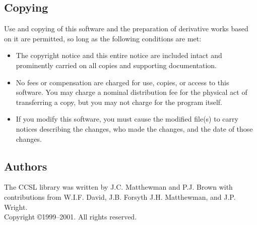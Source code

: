 \subsection{Copying}%
Use and copying of this software and the preparation of derivative
works based on it are permitted, so long as the following
conditions are met:
\begin{itemize}
\item 
The copyright notice and this entire notice are included intact
and prominently carried on all copies and supporting documentation.
\item 
No fees or compensation are charged for use, copies, or
access to this software. You may charge a nominal
distribution fee for the physical act of transferring a
copy, but you may not charge for the program itself. 
\item 
If you modify this software, you must cause the modified
file(s) to carry notices describing the changes, who made 
the changes, and the date
of those changes.
\end{itemize} 
\subsection{Authors}
The CCSL library was written by J.C. Matthewman and P.J. Brown with
contributions from W.I.F. David, J.B. Forsyth J.H. Matthewman, and J.P. Wright.\\[2ex] %
Copyright \copyright 1999--2001. All rights reserved.
\\[3ex]
\finchapter

